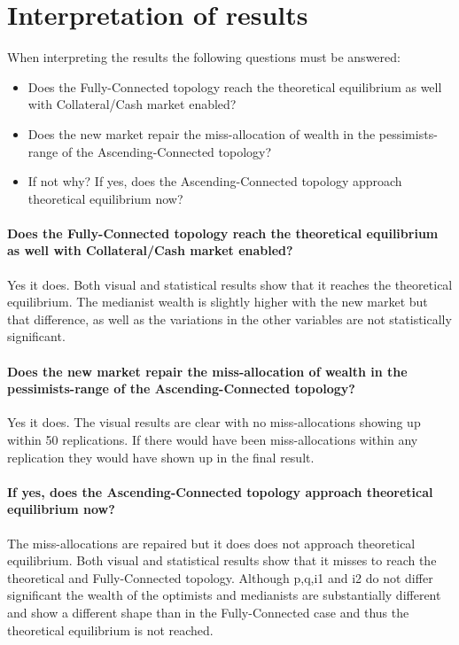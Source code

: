 \documentclass[Bachelorarbeit.tex]{subfiles}
\begin{document}
\section{Interpretation of results}
When interpreting the results the following questions must be answered:

\begin{itemize}
\item Does the Fully-Connected topology reach the theoretical equilibrium as well with Collateral/Cash market enabled?
\item Does the new market repair the miss-allocation of wealth in the pessimists-range of the Ascending-Connected topology?
\item If not why? If yes, does the Ascending-Connected topology approach theoretical equilibrium now?
\end{itemize}

\paragraph{Does the Fully-Connected topology reach the theoretical equilibrium as well with Collateral/Cash market enabled?}
Yes it does. Both visual and statistical results show that it reaches the theoretical equilibrium. The medianist wealth is slightly higher with the new market but that difference, as well as the variations in the other variables are not statistically significant.

\paragraph{Does the new market repair the miss-allocation of wealth in the pessimists-range of the Ascending-Connected topology?}
Yes it does. The visual results are clear with no miss-allocations showing up within 50 replications. If there would have been miss-allocations within any replication they would have shown up in the final result.

\paragraph{If yes, does the Ascending-Connected topology approach theoretical equilibrium now?}
The miss-allocations are repaired but it does does not approach theoretical equilibrium. Both visual and statistical results show that it misses to reach the theoretical and Fully-Connected topology. Although p,q,i1 and i2 do not differ significant the wealth of the optimists and medianists are substantially different and show a different shape than in the Fully-Connected case and thus the theoretical equilibrium is not reached.
\end{document}
